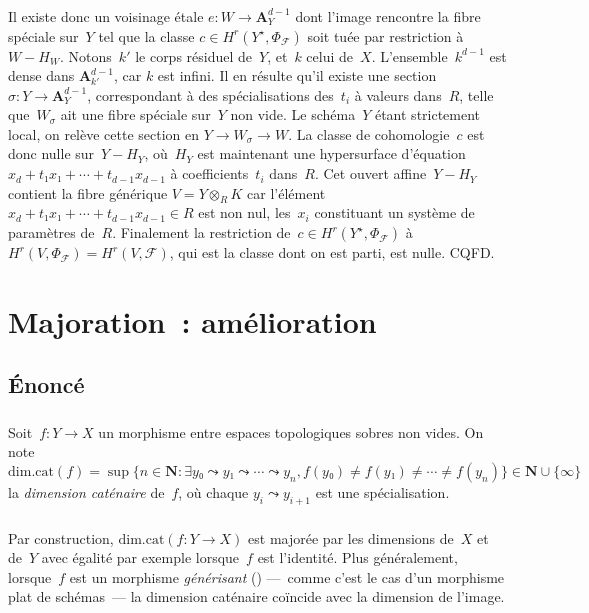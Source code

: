 \documentclass[10pt]{../fichiers-configuration-latex/smfart}
\begin{document}
\subsubsection{}
Il existe donc un voisinage étale $e:W → 𝐀^{d-1}_Y$ dont l'image
rencontre la fibre spéciale sur $Y$ tel que la classe $c ∈ H^r(Y^⋆,Φ_ℱ)$
soit tuée par restriction à $W-H_W$. Notons $k′$
le corps résiduel de $Y$, et $k$ celui de $X$.
L'ensemble $k^{d-1}$ est dense dans $𝐀^{d-1}_{k′}$, car $k$
est infini. Il en résulte qu'il existe une section $σ: Y →
𝐀^{d-1}_Y$, correspondant à des spécialisations des $t_i$
à valeurs dans $R$, telle que $W_σ$ ait une fibre spéciale
sur $Y$ non vide. Le schéma $Y$ étant strictement local, on relève
cette section en $Y → W_σ → W$. La classe de cohomologie $c$
est donc nulle sur $Y-H_Y$, où $H_Y$ est maintenant une hypersurface
d'équation $x_d+t₁x₁+\cdots+t_{d-1}x_{d-1}$ à coefficients $t_i$ dans $R$.
Cet ouvert affine $Y-H_Y$ contient la fibre générique $V=Y ⊗_R K$
car l'élément $x_d+t₁x₁+\cdots+t_{d-1}x_{d-1} ∈ R$ est non nul,
les $x_i$ constituant un système de paramètres de $R$.
Finalement la restriction de $c ∈ H^r(Y^⋆,Φ_ℱ)$ à $H^r(V,Φ_ℱ)=H^r(V,ℱ)$,
qui est la classe dont on est parti, est nulle. CQFD.

\section{Majoration : amélioration}
\label{18B-majoration-générale}

\subsection{Énoncé}

\subsubsection{}Soit $f:Y → X$ un morphisme entre espaces topologiques
sobres non vides.
On note
\[
\mathrm{dim.cat}(f)=\sup \{n ∈ 𝐍 : ∃ y₀ ⤳  y₁ ⤳  \cdots ⤳ y_n,
f(y₀) ≠ f(y₁) ≠ \cdots ≠ f(y_n) \} ∈ 𝐍 ∪ \{∞\}
\]
la \emph{dimension caténaire} de $f$, où chaque $y_i ⤳ y_{i+1}$ est une spécialisation.

\subsubsection{}
Par construction, $\mathrm{dim.cat}(f:Y → X)$ est majorée
par les dimensions de $X$ et de $Y$ avec égalité par exemple
lorsque $f$ est l'identité.
Plus généralement, lorsque $f$ est un morphisme \emph{générisant} ()
— comme c'est le cas d'un morphisme plat de schémas —
la dimension caténaire coïncide avec la dimension de
l'image.
\end{document}
